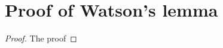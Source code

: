 \section{Proof of Watson's lemma}
\label{sec:proof-watson}
\begin{theorem}
    
    \begin{proof}
        The proof 
    \end{proof}
\end{theorem}
